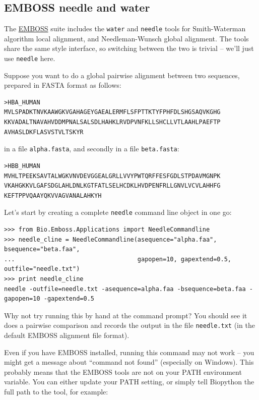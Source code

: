 \documentclass{report}
\begin{document}
\subsection{EMBOSS needle and water}
\label{seq:emboss-needle-water}
The \href{http://emboss.sourceforge.net/}{EMBOSS} suite includes the \texttt{water} and
\texttt{needle} tools for Smith-Waterman algorithm local alignment, and Needleman-Wunsch
global alignment. The tools share the same style interface, so switching between the two
is trivial -- we'll just use \texttt{needle} here.

Suppose you want to do a global pairwise alignment between two sequences, prepared in
FASTA format as follows:

\begin{verbatim}
>HBA_HUMAN
MVLSPADKTNVKAAWGKVGAHAGEYGAEALERMFLSFPTTKTYFPHFDLSHGSAQVKGHG
KKVADALTNAVAHVDDMPNALSALSDLHAHKLRVDPVNFKLLSHCLLVTLAAHLPAEFTP
AVHASLDKFLASVSTVLTSKYR
\end{verbatim}

\noindent in a file \texttt{alpha.fasta}, and secondly in a file \texttt{beta.fasta}:

\begin{verbatim}
>HBB_HUMAN
MVHLTPEEKSAVTALWGKVNVDEVGGEALGRLLVVYPWTQRFFESFGDLSTPDAVMGNPK
VKAHGKKVLGAFSDGLAHLDNLKGTFATLSELHCDKLHVDPENFRLLGNVLVCVLAHHFG
KEFTPPVQAAYQKVVAGVANALAHKYH
\end{verbatim}

Let's start by creating a complete \texttt{needle} command line object in one go:

\begin{verbatim}
>>> from Bio.Emboss.Applications import NeedleCommandline
>>> needle_cline = NeedleCommandline(asequence="alpha.faa", bsequence="beta.faa",
...                                  gapopen=10, gapextend=0.5, outfile="needle.txt")
>>> print needle_cline
needle -outfile=needle.txt -asequence=alpha.faa -bsequence=beta.faa -gapopen=10 -gapextend=0.5 
\end{verbatim}

Why not try running this by hand at the command prompt? You should see it does a
pairwise comparison and records the output in the file \texttt{needle.txt} (in the
default EMBOSS alignment file format).

Even if you have EMBOSS installed, running this command may not work -- you
might get a message about ``command not found'' (especially on Windows). This
probably means that the EMBOSS tools are not on your PATH environment
variable. You can either update your PATH setting, or simply tell Biopython
the full path to the tool, for example:
\end{document}
